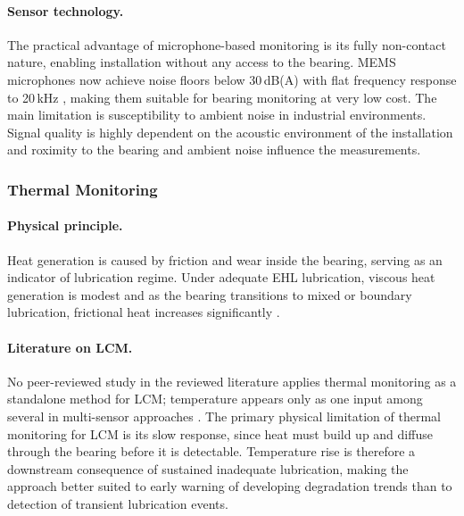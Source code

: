 \paragraph{Sensor technology.}
The practical advantage of microphone-based monitoring is its fully non-contact nature, enabling installation without any access to the bearing. MEMS microphones now achieve noise floors below 30\,dB(A) with flat frequency response to 20\,kHz \cite{murphy_choosing_2020}, making them suitable for bearing monitoring at very low cost. The main limitation is susceptibility to ambient noise in industrial environments. Signal quality is highly dependent on the acoustic environment of the installation and roximity to the bearing and ambient noise influence the measurements.

\subsubsection{Thermal Monitoring}
\label{subsubsec:thermal}

\paragraph{Physical principle.} Heat generation is caused by friction and wear inside the bearing, serving as an indicator of lubrication regime. Under adequate EHL lubrication, viscous heat generation is modest and as the bearing transitions to mixed or boundary lubrication, frictional heat increases significantly \cite{yan_thermal_2019}.

\paragraph{Literature on LCM.} No peer-reviewed study in the reviewed literature applies thermal monitoring as a standalone method for LCM; temperature appears only as one input among several in multi-sensor approaches \cite{zhang_graph-data-based_2024}. The primary physical limitation of thermal monitoring for LCM is its slow response, since heat must build up and diffuse through the bearing before it is detectable. Temperature rise is therefore a downstream consequence of sustained inadequate lubrication, making the approach better suited to early warning of developing degradation trends than to detection of transient lubrication events.

